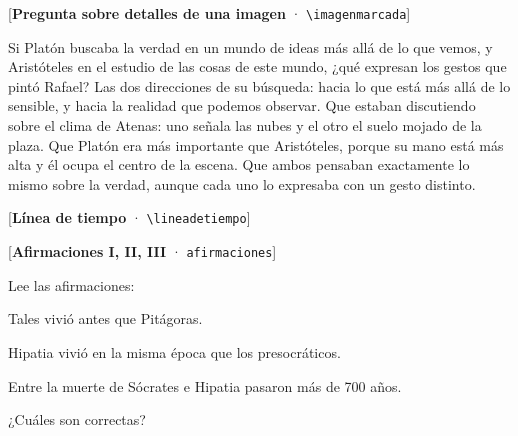 \documentclass[carta,doscolumnas,compacta]{evaluacion}
\newcommand{\formato}[2]{{\fontsize{6.5}{7.5}\selectfont\color{acento}[\textbf{#1} · \texttt{#2}]}\par}
\begin{document}
\begin{preguntas}
\begin{pregunta}[A]
\formato{Pregunta sobre detalles de una imagen}{\textbackslash imagenmarcada}
Si Platón buscaba la verdad en un mundo de ideas más allá de lo que vemos, y Aristóteles en el
estudio de las cosas de este mundo, ¿qué expresan los gestos que pintó Rafael?
\opcioneslargas
  {Las dos direcciones de su búsqueda: hacia lo que está más allá de lo sensible, y hacia la realidad que podemos observar.}
  {Que estaban discutiendo sobre el clima de Atenas: uno señala las nubes y el otro el suelo mojado de la plaza.}
  {Que Platón era más importante que Aristóteles, porque su mano está más alta y él ocupa el centro de la escena.}
  {Que ambos pensaban exactamente lo mismo sobre la verdad, aunque cada uno lo expresaba con un gesto distinto.}
\end{pregunta}

\begin{contexto}
\formato{Línea de tiempo}{\textbackslash lineadetiempo}
\end{contexto}

\begin{pregunta}[D]
\formato{Afirmaciones I, II, III}{afirmaciones}
Lee las afirmaciones:
\begin{afirmaciones}
\item Tales vivió antes que Pitágoras.
\item Hipatia vivió en la misma época que los presocráticos.
\item Entre la muerte de Sócrates e Hipatia pasaron más de 700 años.
\end{afirmaciones}
¿Cuáles son correctas?
\end{pregunta}


\end{preguntas}
\end{document}
